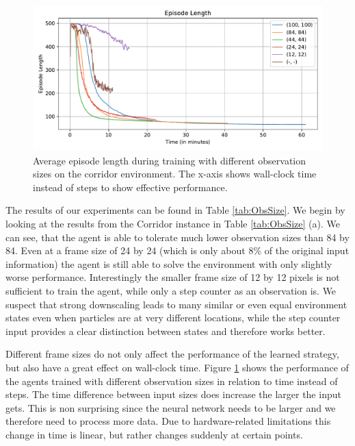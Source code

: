 \begin{figure}[htp]
    \begin{center}
        \includegraphics[clip, width=0.95\columnwidth]{figures/evaluation/observations/maze0318_ep_len_time.pdf}
    \end{center}
    \caption[Episode Length on the Corridor Environment using Different Observation Sizes]{Average episode length during training with different observation sizes on the corridor environment. The x-axis shows wall-clock time instead of steps to show effective performance.} \label{fig:ObsSize/Maze0318/EpLen}
\end{figure}


The results of our experiments can be found in Table \ref{tab:ObsSize}. We begin by looking at the results from the Corridor instance in Table \ref{tab:ObsSize} (a). We can see, that the agent is able to tolerate much lower observation sizes than 84 by 84. Even at a frame size of 24 by 24 (which is only about 8\% of the original input information) the agent is still able to solve the environment with only slightly worse performance. Interestingly the smaller frame size of 12 by 12 pixels is not sufficient to train the agent, while only a step counter as an observation is. We suspect that strong downscaling leads to many similar or even equal environment states even when particles are at very different locations, while the step counter input provides a clear distinction between states and therefore works better.

Different frame sizes do not only affect the performance of the learned strategy, but also have a great effect on wall-clock time. Figure \ref{fig:ObsSize/Maze0318/EpLen} shows the performance of the agents trained with different observation sizes in relation to time instead of steps. The time difference between input sizes does increase the larger the input gets. This is non surprising since the neural network needs to be larger and we therefore need to process more data. Due to hardware-related limitations this change in time is linear, but rather changes suddenly at certain points.

